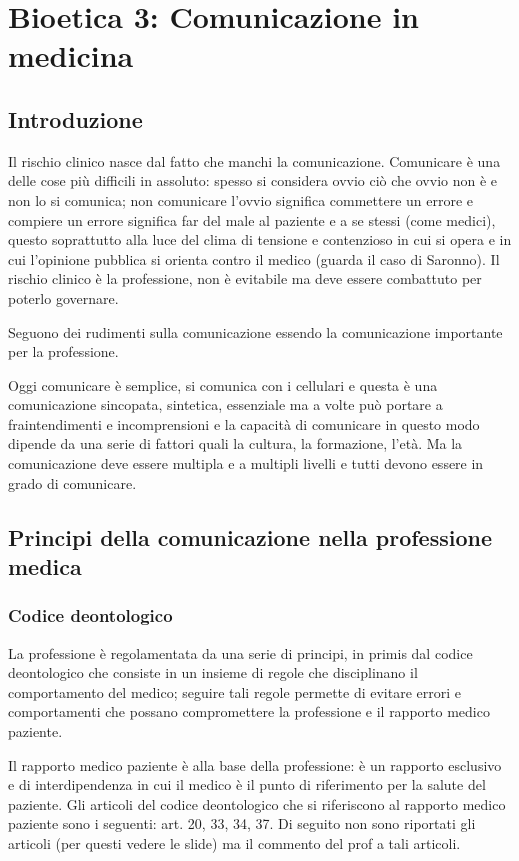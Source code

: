 \section{Bioetica 3: Comunicazione in medicina}

\subsection{Introduzione}

Il rischio clinico nasce dal fatto che manchi la comunicazione.
Comunicare è una delle cose più difficili in assoluto: spesso si
considera ovvio ciò che ovvio non è e non lo si comunica; non comunicare
l'ovvio significa commettere un errore e compiere un errore significa
far del male al paziente e a se stessi (come medici), questo soprattutto
alla luce del clima di tensione e contenzioso in cui si opera e in cui
l'opinione pubblica si orienta contro il medico (guarda il caso di
Saronno). Il rischio clinico è la professione, non è evitabile ma deve
essere combattuto per poterlo governare.

Seguono dei rudimenti sulla comunicazione essendo la comunicazione
importante per la professione.

Oggi comunicare è semplice, si comunica con i cellulari e questa è una
comunicazione sincopata, sintetica, essenziale ma a volte può portare a
fraintendimenti e incomprensioni e la capacità di comunicare in questo
modo dipende da una serie di fattori quali la cultura, la formazione,
l'età. Ma la comunicazione deve essere multipla e a multipli livelli e
tutti devono essere in grado di comunicare.

\subsection{Principi della comunicazione nella professione medica}

\subsubsection{Codice deontologico}

La professione è regolamentata da una serie di principi, in primis dal
codice deontologico che consiste in un insieme di regole che
disciplinano il comportamento del medico; seguire tali regole permette
di evitare errori e comportamenti che possano compromettere la
professione e il rapporto medico paziente.

Il rapporto medico paziente è alla base della professione: è un rapporto
esclusivo e di interdipendenza in cui il medico è il punto di
riferimento per la salute del paziente. Gli articoli del codice
deontologico che si riferiscono al rapporto medico paziente sono i
seguenti: art. 20, 33, 34, 37. Di seguito non sono riportati gli
articoli (per questi vedere le slide) ma il commento del prof a tali
articoli.

